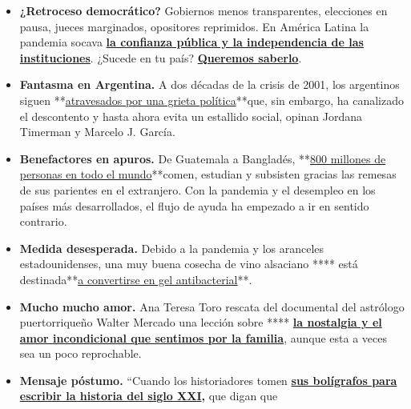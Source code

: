 \begin{itemize}
\item
  \textbf{¿Retroceso democrático?} Gobiernos menos transparentes,
  elecciones en pausa, jueces marginados, opositores reprimidos. En
  América Latina la pandemia socava
  \textbf{\href{https://www.nytimes3xbfgragh.onion/es/2020/07/29/espanol/america-latina/democracia-america-latina-pandemia.html}{la
  confianza pública y la independencia de las instituciones}}. ¿Sucede
  en tu país?
  \textbf{\href{https://www.nytimes3xbfgragh.onion/es/2020/07/29/espanol/america-latina/democracia-america-latina-pandemia.html\#commentsContainer}{Queremos
  saberlo}}.
\item
  \textbf{Fantasma en Argentina.} A dos décadas de la crisis de 2001,
  los argentinos siguen
  **\href{https://www.nytimes3xbfgragh.onion/es/2020/07/28/espanol/opinion/argentina-estallido-2001-coronavirus.html}{atravesados
  por una grieta política}**que, sin embargo, ha canalizado el
  descontento y hasta ahora evita un estallido social, opinan Jordana
  Timerman y Marcelo J. García.
\item
  \textbf{Benefactores en apuros.} De Guatemala a Bangladés,
  **\href{https://www.nytimes3xbfgragh.onion/es/2020/07/28/espanol/mundo/remesas-coronavirus.html}{800
  millones de personas en todo el mundo}**comen, estudian y subsisten
  gracias las remesas de sus parientes en el extranjero. Con la pandemia
  y el desempleo en los países más desarrollados, el flujo de ayuda ha
  empezado a ir en sentido contrario.
\item
  \textbf{Medida desesperada.} Debido a la pandemia y los aranceles
  estadounidenses, una muy buena cosecha de vino alsaciano **** está
  destinada**\href{https://www.nytimes3xbfgragh.onion/es/2020/07/28/espanol/mundo/vino-blanco-alsacia-coronavirus.html}{a
  convertirse en gel antibacterial}**.
\item
  \textbf{Mucho mucho amor.} Ana Teresa Toro rescata del documental del
  astrólogo puertorriqueño Walter Mercado una lección sobre ****
  \textbf{\href{https://www.nytimes3xbfgragh.onion/es/2020/07/24/espanol/opinion/walter-mercado-amor-netflix.html}{la
  nostalgia y el amor incondicional que sentimos por la familia}},
  aunque esta a veces sea un poco reprochable.
\item
  \textbf{Mensaje póstumo.} ``Cuando los historiadores tomen
  \textbf{\href{https://www.nytimes3xbfgragh.onion/es/2020/07/30/espanol/opinion/john-lewis-derechos-civiles.html}{sus
  bolígrafos para escribir la historia del siglo XXI},} que digan que

\end{itemize}
